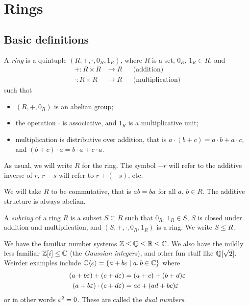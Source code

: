 \documentclass{../../template/note}
\begin{document}
    \section{Rings}
    
    \subsection{Basic definitions}

    \begin{definition}[Ring]
        A \emph{ring} is a quintuple $(R, +, \cdot, 0_R, 1_R)$, where $R$ is a set, $0_R$, $1_R \in R$, and
        \begin{align*}
            +: R \times R &\to R && \text{(addition)}\\
            \cdot: R \times R &\to R && \text{(multiplication)}
        \end{align*}
        such that
        \begin{itemize}
            \item $(R, +, 0_R)$ is an abelian group;
            \item the operation $\cdot$ is associative, and $1_R$ is a multiplicative unit;
            \item multiplication is distributive over addition, that is $a \cdot (b + c) = a \cdot b + a \cdot c$, and $(b + c) \cdot a = b \cdot a + c \cdot a$.
        \end{itemize}
    \end{definition}
    
    As usual, we will write $R$ for the ring. The symbol $-r$ will refer to the additive inverse of $r$, $r-s$ will refer to $r+(-s)$, etc.

    \begin{remark*}
        We will take $R$ to be commutative, that is $ab = ba$ for all $a$, $b \in R$. The additive structure is always abelian.
    \end{remark*}
    
    \begin{definition}[Subring]
        A \emph{subring} of a ring $R$ is a subset $S \subseteq R$ such that $0_R$, $1_R \in S$, $S$ is closed under addition and multiplication, and $(S, +, \cdot, 0_R, 1_R)$ is a ring. We write $S \leq R$.
    \end{definition}
    
    \begin{example*}
        We have the familiar number systems $\mathbb Z \leq \mathbb Q \leq \mathbb R \leq \mathbb C$. We also have the mildly less familiar $\mathbb Z[i] \leq \mathbb C$ (the \emph{Gaussian integers}), and other fun stuff like $\mathbb Q[\sqrt 2]$. Weirder examples include $\mathbb C\langle\varepsilon\rangle = \{a + b \varepsilon \mid a, b \in \mathbb C\}$ where
        \begin{align*}
            (a + b\varepsilon) + (c + d\varepsilon) &= (a + c) + (b + d)\varepsilon \\
            (a + b\varepsilon) \cdot (c + d\varepsilon) &= ac + (ad+bc)\varepsilon
        \end{align*}
        or in other words $\varepsilon^2 = 0$. These are called the \emph{dual numbers}.        
    \end{example*}
    
\end{document}
